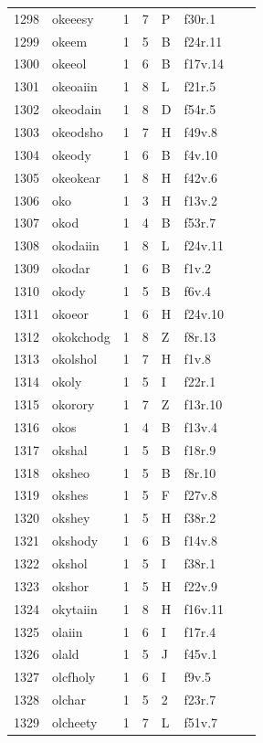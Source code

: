 \documentclass[11pt,a4paper]{article}
\begin{document}
\begin{landscape}
\begin{longtable}{@{}r>{\ttfamily}lrrl>{\ttfamily}l>{\raggedright\arraybackslash}p{80mm}>{\raggedright\arraybackslash}p{36mm}@{}}
1298 & okeeesy & 1 & 7 & P & f30r.1 &  & \\
1299 & okeem & 1 & 5 & B & f24r.11 &  & \\
1300 & okeeol & 1 & 6 & B & f17v.14 &  & \\
1301 & okeoaiin & 1 & 8 & L & f21r.5 &  & \\
1302 & okeodain & 1 & 8 & D & f54r.5 &  & \\
1303 & okeodsho & 1 & 7 & H & f49v.8 &  & \\
1304 & okeody & 1 & 6 & B & f4v.10 &  & \\
1305 & okeokear & 1 & 8 & H & f42v.6 &  & \\
1306 & oko & 1 & 3 & H & f13v.2 &  & \\
1307 & okod & 1 & 4 & B & f53r.7 &  & \\
1308 & okodaiin & 1 & 8 & L & f24v.11 &  & \\
1309 & okodar & 1 & 6 & B & f1v.2 &  & \\
1310 & okody & 1 & 5 & B & f6v.4 &  & \\
1311 & okoeor & 1 & 6 & H & f24v.10 &  & \\
1312 & okokchodg & 1 & 8 & Z & f8r.13 &  & \\
1313 & okolshol & 1 & 7 & H & f1v.8 &  & \\
1314 & okoly & 1 & 5 & I & f22r.1 &  & \\
1315 & okorory & 1 & 7 & Z & f13r.10 &  & \\
1316 & okos & 1 & 4 & B & f13v.4 &  & \\
1317 & okshal & 1 & 5 & B & f18r.9 &  & \\
1318 & oksheo & 1 & 5 & B & f8r.10 &  & \\
1319 & okshes & 1 & 5 & F & f27v.8 &  & \\
1320 & okshey & 1 & 5 & H & f38r.2 &  & \\
1321 & okshody & 1 & 6 & B & f14v.8 &  & \\
1322 & okshol & 1 & 5 & I & f38r.1 &  & \\
1323 & okshor & 1 & 5 & H & f22v.9 &  & \\
1324 & okytaiin & 1 & 8 & H & f16v.11 &  & \\
1325 & olaiin & 1 & 6 & I & f17r.4 &  & \\
1326 & olald & 1 & 5 & J & f45v.1 &  & \\
1327 & olcfholy & 1 & 6 & I & f9v.5 &  & \\
1328 & olchar & 1 & 5 & 2 & f23r.7 &  & \\
1329 & olcheety & 1 & 7 & L & f51v.7 &  & \\

\end{longtable}
\end{landscape}
\end{document}

